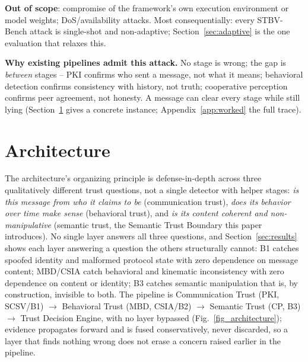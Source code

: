 \documentclass[conference]{IEEEtran}
\begin{document}
\textbf{Out of scope}: compromise of the framework's own execution environment or model weights; DoS/availability attacks. Most consequentially: every STBV-Bench attack is single-shot and non-adaptive; Section~\ref{sec:adaptive} is the one evaluation that relaxes this.

\textbf{Why existing pipelines admit this attack.} No stage is wrong; the gap is \emph{between} stages -- PKI confirms who sent a message, not what it means; behavioral detection confirms consistency with history, not truth; cooperative perception confirms peer agreement, not honesty. A message can clear every stage while still lying (Section~\ref{sec:architecture} gives a concrete instance; Appendix~\ref{app:worked} the full trace).

\section{Architecture}
\label{sec:architecture}
The architecture's organizing principle is defense-in-depth across three qualitatively different trust questions, not a single detector with helper stages: \emph{is this message from who it claims to be} (communication trust), \emph{does its behavior over time make sense} (behavioral trust), and \emph{is its content coherent and non-manipulative} (semantic trust, the Semantic Trust Boundary this paper introduces). No single layer answers all three questions, and Section~\ref{sec:results} shows each layer answering a question the others structurally cannot: B1 catches spoofed identity and malformed protocol state with zero dependence on message content; MBD/CSIA catch behavioral and kinematic inconsistency with zero dependence on content or identity; B3 catches semantic manipulation that is, by construction, invisible to both. The pipeline is Communication Trust (PKI, SCSV/B1) $\to$ Behavioral Trust (MBD, CSIA/B2) $\to$ Semantic Trust (CP, B3) $\to$ Trust Decision Engine, with no layer bypassed (Fig.~\ref{fig_architecture}); evidence propagates forward and is fused conservatively, never discarded, so a layer that finds nothing wrong does not erase a concern raised earlier in the pipeline.
\end{document}

